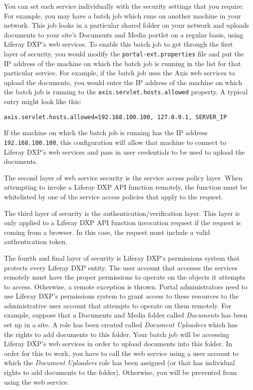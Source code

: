 You can set each service individually with the security settings that
you require. For example, you may have a batch job which runs on another
machine in your network. This job looks in a particular shared folder on
your network and uploads documents to your site's Documents and Media
portlet on a regular basis, using Liferay DXP's web services. To enable
this batch job to get through the first layer of security, you would
modify the \texttt{portal-ext.properties} file and put the IP address of
the machine on which the batch job is running in the list for that
particular service. For example, if the batch job uses the Axis web
services to upload the documents, you would enter the IP address of the
machine on which the batch job is running to the
\texttt{axis.servlet.hosts.allowed} property. A typical entry might look
like this:

\begin{verbatim}
axis.servlet.hosts.allowed=192.168.100.100, 127.0.0.1, SERVER_IP
\end{verbatim}

If the machine on which the batch job is running has the IP address
\texttt{192.168.100.100}, this configuration will allow that machine to
connect to Liferay DXP's web services and pass in user credentials to be
used to upload the documents.

The second layer of web service security is the service access policy
layer. When attempting to invoke a Liferay DXP API function remotely,
the function must be whitelisted by one of the service access policies
that apply to the request.

The third layer of security is the authentication/verification layer.
This layer is only applied to a Liferay DXP API function invocation
request if the request is coming from a browser. In this case, the
request must include a valid authentication token.

The fourth and final layer of security is Liferay DXP's permissions
system that protects every Liferay DXP entity. The user account that
accesses the services remotely must have the proper permissions to
operate on the objects it attempts to access. Otherwise, a remote
exception is thrown. Portal administrators need to use Liferay DXP's
permissions system to grant access to these resources to the
administrative user account that attempts to operate on them remotely.
For example, suppose that a Documents and Media folder called
\emph{Documents} has been set up in a site. A role has been created
called \emph{Document Uploaders} which has the rights to add documents
to this folder. Your batch job will be accessing Liferay DXP's web
services in order to upload documents into this folder. In order for
this to work, you have to call the web service using a user account to
which the \emph{Document Uploaders} role has been assigned (or that has
individual rights to add documents to the folder). Otherwise, you will
be prevented from using the web service.

